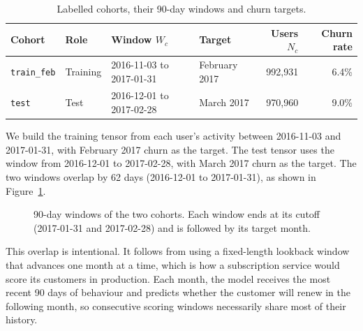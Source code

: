 \documentclass{article}
\begin{document}
\begin{table}[H]
\centering
\renewcommand{\arraystretch}{1.3}
\begin{tabular}{|l|l|l|l|r|r|}
\hline
\textbf{Cohort} & \textbf{Role} & \textbf{Window $W_c$} & \textbf{Target} & \textbf{Users $N_c$} & \textbf{Churn rate} \\ \hline
\texttt{train\_feb} & Training & 2016-11-03 to 2017-01-31 & February 2017 & 992{,}931 & 6.4\% \\ \hline
\texttt{test}       & Test     & 2016-12-01 to 2017-02-28 & March 2017    & 970{,}960 & 9.0\% \\ \hline
\end{tabular}
\caption{Labelled cohorts, their 90-day windows and churn targets.}
\label{tab:w2_cohorts}
\end{table}

We build the training tensor from each user's activity between 2016-11-03 and 2017-01-31, with February 2017 churn as the target. The test tensor uses the window from 2016-12-01 to 2017-02-28, with March 2017 churn as the target. The two windows overlap by 62 days (2016-12-01 to 2017-01-31), as shown in Figure~\ref{fig:w2_overlap}.

\begin{figure}[H]
\centering
{}
\caption{90-day windows of the two cohorts. Each window ends at its cutoff (2017-01-31 and 2017-02-28) and is followed by its target month.}
\label{fig:w2_overlap}
\end{figure}

This overlap is intentional. It follows from using a fixed-length lookback window that advances one month at a time, which is how a subscription service would score its customers in production. Each month, the model receives the most recent 90 days of behaviour and predicts whether the customer will renew in the following month, so consecutive scoring windows necessarily share most of their history.
\end{document}
